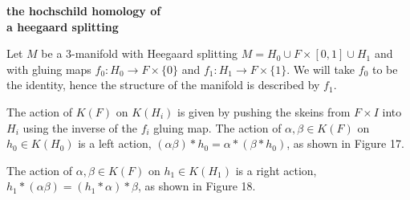 \documentclass{slides}
\newcommand{\lcr}{\raisebox{-10pt}{\mbox{}\hspace{1pt}
                  \epsfxsize = 1cm \epsfysize = 1cm
                  \epsfbox{figs/leftcross.eps}\hspace{1pt}\mbox{}}}
\newcommand{\ift}{\raisebox{-10pt}{\mbox{}\hspace{1pt}
                  \epsfxsize = 1cm \epsfysize = 1cm
                  \epsfbox{figs/infinity.eps}\hspace{1pt}\mbox{}}}
\newcommand{\zer}{\raisebox{-10pt}{\mbox{}\hspace{1pt}
                  \epsfxsize = 1cm \epsfysize = 1cm
                  \epsfbox{figs/zero.eps}\hspace{1pt}\mbox{}}}
\newcommand{\bbc}{\mathbb{C}}
\newcommand{\slc}{SL_2(\mathbb{C})}
\newtheorem{theorem}{Theorem}
\newtheorem{example}{Example}
\theoremstyle{definition}
\begin{document}




\begin{slide}
\textbf{the hochschild homology of \\ a heegaard splitting}

Let $M$ be a 3-manifold with Heegaard
splitting $M = H_0 \cup F \times [0,1] \cup H_1$
and with gluing maps $f_0 : H_0 \to F \times \{0\}$ and
$f_1: H_1 \to F \times \{1\}$.
We will take $f_0$ to be the identity, hence the structure of the manifold
is described by $f_1$.

The action of $K(F)$ on $K(H_i)$ is
given by pushing the skeins from $F \times I$ into $H_i$ using the inverse of
the $f_i$ gluing map.
The action of $\alpha, \beta \in K(F)$ on $h_0 \in K(H_0)$ is a left action,
$(\alpha \beta) * h_0 = \alpha * (\beta * h_0)$,
as shown in Figure 17.

The action of $\alpha, \beta \in K(F)$ on $h_1 \in K(H_1)$ is a right action,
$h_1 * (\alpha \beta) = (h_1 * \alpha) * \beta$, as shown in Figure 18.
\end{slide}
\end{document}
